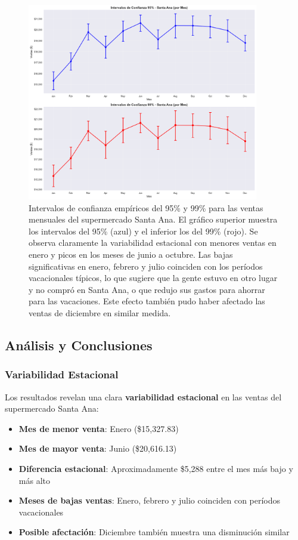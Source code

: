 \documentclass[11pt,a4paper]{article}
\begin{document}
\begin{figure}[H]
\centering
\includegraphics[width=0.9\textwidth]{../data/output1.png}
\caption{Intervalos de confianza empíricos del 95\% y 99\% para las ventas mensuales del supermercado Santa Ana. El gráfico superior muestra los intervalos del 95\% (azul) y el inferior los del 99\% (rojo). Se observa claramente la variabilidad estacional con menores ventas en enero y picos en los meses de junio a octubre. Las bajas significativas en enero, febrero y julio coinciden con los períodos vacacionales típicos, lo que sugiere que la gente estuvo en otro lugar y no compró en Santa Ana, o que redujo sus gastos para ahorrar para las vacaciones. Este efecto también pudo haber afectado las ventas de diciembre en similar medida.}
\label{fig:intervalos_santa_ana}
\end{figure}

\subsection{Análisis y Conclusiones}

\subsubsection{Variabilidad Estacional}

Los resultados revelan una clara \textbf{variabilidad estacional} en las ventas del supermercado Santa Ana:

\begin{itemize}
    \item \textbf{Mes de menor venta}: Enero (\$15,327.83)
    \item \textbf{Mes de mayor venta}: Junio (\$20,616.13)
    \item \textbf{Diferencia estacional}: Aproximadamente \$5,288 entre el mes más bajo y más alto
    \item \textbf{Meses de bajas ventas}: Enero, febrero y julio coinciden con períodos vacacionales
    \item \textbf{Posible afectación}: Diciembre también muestra una disminución similar
\end{itemize}
\end{document}

